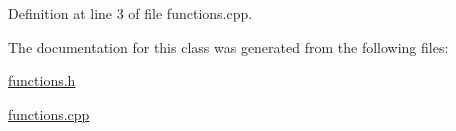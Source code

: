 Definition at line 3 of file functions.\-cpp.



The documentation for this class was generated from the following files\-:\begin{DoxyCompactItemize}
\item 
\hyperlink{functions_8h}{functions.\-h}\item 
\hyperlink{functions_8cpp}{functions.\-cpp}\end{DoxyCompactItemize}

